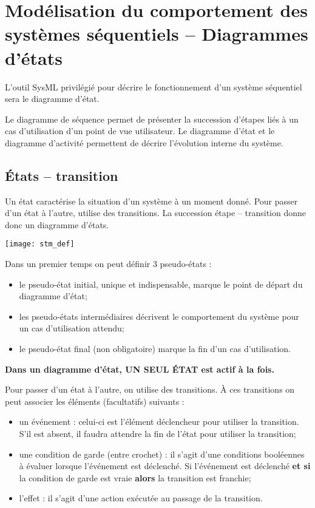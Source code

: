 \section{Modélisation du comportement des systèmes séquentiels -- Diagrammes d'états \cite{1}}

L'outil SysML privilégié pour décrire le fonctionnement d'un système séquentiel sera le diagramme d'état.

Le diagramme de séquence permet de présenter la succession d'étapes liés à un cas d'utilisation d'un point de vue utilisateur. Le diagramme d'état et le diagramme d'activité permettent de décrire l'évolution interne du système. 
                           

\subsection{États -- transition}
\begin{defi}
Un état caractérise la situation d'un système à un moment donné. Pour passer d'un état à l'autre,  utilise des transitions. La succession étape -- transition donne donc un diagramme d'états. 

\begin{center}
\texttt{[image: stm\_def]}
\end{center}

Dans un premier temps on peut définir 3 pseudo-états : 
\begin{itemize}
\item le pseudo-état initial, unique et indispensable, marque le point de départ du diagramme d'état;
\item les pseudo-états intermédiaires décrivent le comportement du système pour un cas d'utilisation attendu;
\item le pseudo-état final (non obligatoire) marque la fin d'un cas d'utilisation.
\end{itemize}

\textbf{Dans un diagramme d'état, UN SEUL ÉTAT est actif à la fois.}

Pour passer d'un état à l'autre, on utilise des transitions. À ces transitions on peut associer les éléments (facultatifs) suivants :
\begin{itemize}
\item un événement : celui-ci est l'élément déclencheur pour utiliser la transition. S'il est absent, il faudra attendre la fin de l'état pour utiliser la transition;
\item une condition de garde (entre crochet) : il s'agit d'une conditions booléennes à évaluer lorsque l'événement est déclenché. Si l'événement est déclenché \textbf{et si} la condition de garde est vraie \textbf{alors} la transition est franchie;
\item l'effet : il s'agit d'une action exécutée au passage de la transition. 
\end{itemize}
\end{defi}
